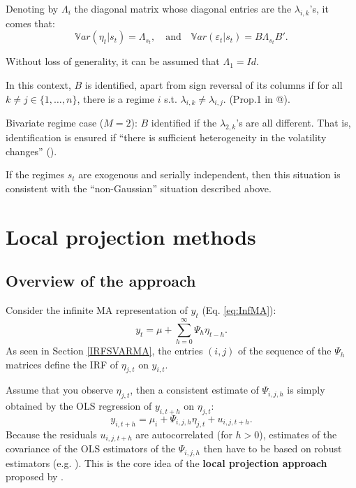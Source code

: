 \documentclass[
  12pt,
]{book}
\theoremstyle{definition}
\theoremstyle{definition}
\theoremstyle{definition}
\theoremstyle{definition}
\theoremstyle{remark}
\begin{document}
Denoting by \(\Lambda_i\) the diagonal matrix whose diagonal entries are the \(\lambda_{i,k}\)'s, it comes that:
\[
\mathbb{V}ar(\eta_{t}|s_t) = \Lambda_{s_t},\quad \mbox{and}\quad \mathbb{V}ar(\varepsilon_{t}|s_t) = B\Lambda_{s_t}B'.
\]

Without loss of generality, it can be assumed that \(\Lambda_1=Id\).

In this context, \(B\) is identified, apart from sign reversal of its columns if for all \(k \ne j \in \{1,\dots,n\}\), there is a regime \(i\) s.t. \(\lambda_{i,k} \ne \lambda_{i,j}\). (Prop.1 in @\citet{LANNE2010121}).

Bivariate regime case (\(M=2\)): \(B\) identified if the \(\lambda_{2,k}\)'s are all different. That is, identification is ensured if ``there is sufficient heterogeneity in the volatility changes'' (\citet{LUTKEPOHL20172}).

If the regimes \(s_t\) are exogenous and serially independent, then this situation is consistent with the ``non-Gaussian'' situation described above.

\hypertarget{Projections}{%
\chapter{Local projection methods}\label{Projections}}

\hypertarget{overview-of-the-approach}{%
\section{Overview of the approach}\label{overview-of-the-approach}}

Consider the infinite MA representation of \(y_t\) (Eq. \eqref{eq:InfMA}):
\[
y_t = \mu + \sum_{h=0}^\infty \Psi_{h} \eta_{t-h}.
\]
As seen in Section \ref{IRFSVARMA}, the entries \((i,j)\) of the sequence of the \(\Psi_h\) matrices define the IRF of \(\eta_{j,t}\) on \(y_{i,t}\).

Assume that you observe \(\eta_{j,t}\), then a consistent estimate of \(\Psi_{i,j,h}\) is simply obtained by the OLS regression of \(y_{i,t+h}\) on \(\eta_{j,t}\):
\begin{equation}
y_{i,t+h} = \mu_i + \Psi_{i,j,h}\eta_{j,t} + u_{i,j,t+h}.\label{eq:OLS1}
\end{equation}
Because the residuals \(u_{i,j,t+h}\) are autocorrelated (for \(h>0\)), estimates of the covariance of the OLS estimators of the \(\Psi_{i,j,h}\) then have to be based on robust estimators (e.g. \citet{Newey_West_1987}). This is the core idea of the \textbf{local projection approach} proposed by \citet{Jorda_2005}.
\end{document}
